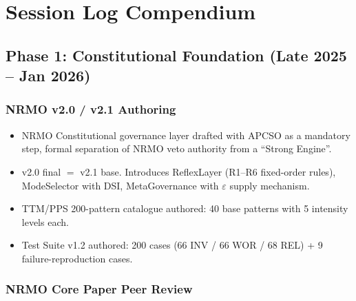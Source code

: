 \chapter{Session Log Compendium}
\label{app:session-log}


\section{Phase 1: Constitutional Foundation (Late 2025 -- Jan 2026)}
\label{sec:session-log-phase-1}

\subsection*{NRMO v2.0 / v2.1 Authoring}

\begin{itemize}
\item NRMO Constitutional governance layer drafted with APCSO as a
mandatory step, formal separation of NRMO veto authority from a
``Strong Engine''.
\item v2.0 final $=$ v2.1 base. Introduces ReflexLayer
(R1--R6 fixed-order rules), ModeSelector with DSI, MetaGovernance
with $\varepsilon$ supply mechanism.
\item TTM/PPS 200-pattern catalogue authored: 40 base patterns with
5 intensity levels each.
\item Test Suite v1.2 authored: 200 cases (66 INV / 66 WOR / 68 REL)
+ 9 failure-reproduction cases.
\end{itemize}

\subsection*{NRMO Core Paper Peer Review}

